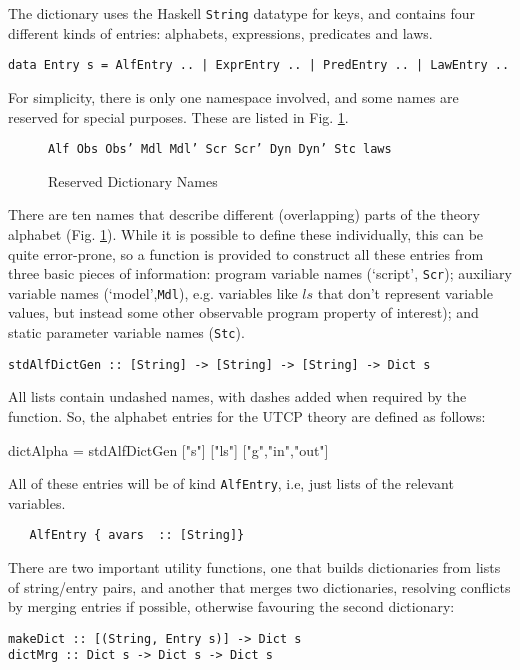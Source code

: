 The dictionary uses the Haskell \texttt{String} datatype for keys,
and contains four different kinds of entries: alphabets,
expressions, predicates and laws.
{\small
\begin{verbatim}
data Entry s = AlfEntry .. | ExprEntry .. | PredEntry .. | LawEntry ..
\end{verbatim}
}
For simplicity, there is only one namespace involved,
and some names are reserved for special purposes.
These are listed in Fig. \ref{fig:rsvd-names}.
\begin{figure}[t]
  \centering
\texttt{Alf Obs Obs' Mdl Mdl' Scr Scr' Dyn Dyn' Stc laws}
  \caption{Reserved Dictionary Names}\label{fig:rsvd-names}
\end{figure}
There are ten names that describe different
(overlapping)
parts of the theory alphabet (Fig. \ref{fig:rsvd-names}).
While it is possible to define these individually,
this can be quite error-prone,
so a function is provided to construct all these entries
from three basic pieces of information:
program variable names (`script', \texttt{Scr});
auxiliary variable names (`model',\texttt{Mdl}),
e.g. variables like $ls$ that don't represent variable values,
but instead some other observable program property of interest);
and static parameter variable names (\texttt{Stc}).
\begin{verbatim}
stdAlfDictGen :: [String] -> [String] -> [String] -> Dict s
\end{verbatim}
All lists contain undashed names, with dashes added when required
by the function.
So, the alphabet entries for the UTCP theory are defined as follows:
\begin{code}
dictAlpha = stdAlfDictGen ["s"] ["ls"] ["g","in","out"]
\end{code}
All of these entries will be of kind \texttt{AlfEntry},
i.e, just lists of the relevant variables.
\begin{verbatim}
   AlfEntry { avars  :: [String]}
\end{verbatim}
There are two important utility functions,
one that builds dictionaries from lists of string/entry pairs,
and another that merges two dictionaries, resolving conflicts
by merging entries if possible, otherwise favouring the
second dictionary:
\begin{verbatim}
makeDict :: [(String, Entry s)] -> Dict s
dictMrg :: Dict s -> Dict s -> Dict s
\end{verbatim}
